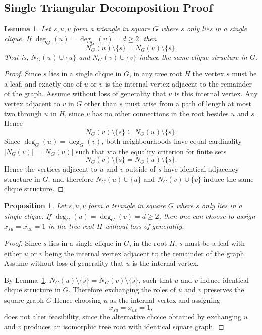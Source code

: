 \documentclass[11pt]{article}
\newtheorem{proposition}{Proposition}
\newtheorem{lemma}{Lemma}
\begin{document}
\subsection{Single Triangular Decomposition Proof} \label{subsuc_STD_proof}

\begin{lemma} \label{lemma::single_triangle_equal_neighbourhood}
  Let $s,u,v$ form a triangle in square $G$ where $s$ only lies in a single clique. If $\deg_G(u)=\deg_G(v)=d\geq 2$, then
  \[
  N_G(u)\setminus\{s\}=N_G(v)\setminus\{s\}.
  \]
  That is, $N_G(u)\cup\{u\}$ and $N_G(v)\cup\{v\}$ induce the same clique structure in $G$.
\end{lemma}
\begin{proof}
  Since $s$ lies in a single clique in $G$, in any tree root $H$ the vertex $s$ must be a leaf, and exactly one of $u$ or $v$ is the internal vertex adjacent to the remainder of the graph. Assume without loss of generality that $u$ is this internal vertex. Any vertex adjacent to $v$ in $G$ other than $s$ must arise from a path of length at most two through $u$ in $H$, since $v$ has no other connections in the root besides $u$ and $s$. Hence
  \[
  N_G(v)\setminus\{s\}\subseteq N_G(u)\setminus\{s\}.
  \]
  Since $\deg_G(u)=\deg_G(v)$, both neighbourhoods have equal cardinality $|N_G(v)| = |N_G(u)|$ such that via the equality criterion for finite sets
  \[
  N_G(v)\setminus\{s\}
  =
  N_G(u)\setminus\{s\}.
  \]
  Hence the vertices adjacent to $u$ and $v$ outside of $s$ have identical adjacency structure in $G$, and therefore $N_G(u)\cup\{u\}$ and $N_G(v)\cup\{v\}$ induce the same clique structure.
\end{proof}

\begin{proposition} \label{prop::single_triangular_decomposition_equality}
  Let $s,u,v$ form a triangle in square $G$ where $s$ only lies in a single clique. If $\deg_G(u)=\deg_G(v)=d\geq2$, then one can choose to assign $x_{su}=x_{uv}=1$ in the tree root $H$ without loss of generality.
\end{proposition}
\begin{proof}
  Since $s$ lies in a single clique in $G$, in the root $H$, $s$ must be a leaf with either $u$ or $v$ being the internal vertex adjacent to the remainder of the graph. Assume without loss of generality that $u$ is the internal vertex.

  By Lemma~\ref{lemma::single_triangle_equal_neighbourhood}, $N_G(u)\setminus\{s\}=N_G(v)\setminus\{s\}$, such that $u$ and $v$ induce identical clique structure in $G$. Therefore exchanging the roles of $u$ and $v$ preserves the square graph $G$.Hence choosing $u$ as the internal vertex and assigning
  \[
  x_{su}=x_{uv}=1,
  \]
  does not alter feasibility, since the alternative choice obtained by exchanging $u$ and $v$ produces an isomorphic tree root with identical square graph.
\end{proof}
\end{document}
